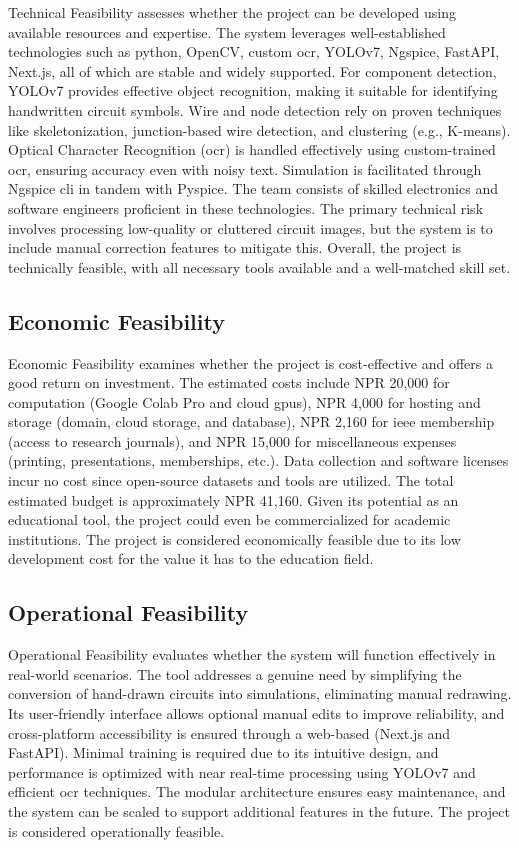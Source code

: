 Technical Feasibility assesses whether the project can be developed using available resources and expertise. The system leverages well-established technologies such as \gls{python}, OpenCV, custom \gls{ocr}, YOLOv7, Ngspice, FastAPI, Next.js, all of which are stable and widely supported. For component detection, YOLOv7 provides effective object recognition, making it suitable for identifying handwritten circuit symbols. Wire and node detection rely on proven techniques like skeletonization, junction-based wire detection, and clustering (e.g., K-means). Optical Character Recognition (\gls{ocr}) is handled effectively using custom-trained \gls{ocr}, ensuring accuracy even with noisy text. Simulation is facilitated through Ngspice \gls{cli} in tandem with Pyspice. The team consists of skilled electronics and software engineers proficient in these technologies. The primary technical risk involves processing low-quality or cluttered circuit images, but the system is to include manual correction features to mitigate this. Overall, the project is technically feasible, with all necessary tools available and a well-matched skill set.

\subsection{Economic Feasibility}

Economic Feasibility examines whether the project is cost-effective and offers a good return on investment. The estimated costs include NPR 20,000 for computation (Google Colab Pro and cloud \glspl{gpu}), NPR 4,000 for hosting and storage (domain, cloud storage, and database), NPR 2,160 for \gls{ieee} membership (access to research journals), and NPR 15,000 for miscellaneous expenses (printing, presentations, memberships, etc.). Data collection and software licenses incur no cost since open-source datasets and tools are utilized. The total estimated budget is approximately NPR 41,160. Given its potential as an educational tool, the project could even be commercialized for academic institutions. The project is considered economically feasible due to its low development cost for the value it has to the education field.

\subsection{Operational Feasibility}

Operational Feasibility evaluates whether the system will function effectively in real-world scenarios. The tool addresses a genuine need by simplifying the conversion of hand-drawn circuits into simulations, eliminating manual redrawing. Its user-friendly interface allows optional manual edits to improve reliability, and cross-platform accessibility is ensured through a web-based (Next.js and FastAPI). Minimal training is required due to its intuitive design, and performance is optimized with near real-time processing using YOLOv7 and efficient \gls{ocr} techniques. The modular architecture ensures easy maintenance, and the system can be scaled to support additional features in the future. The project is considered operationally feasible.


